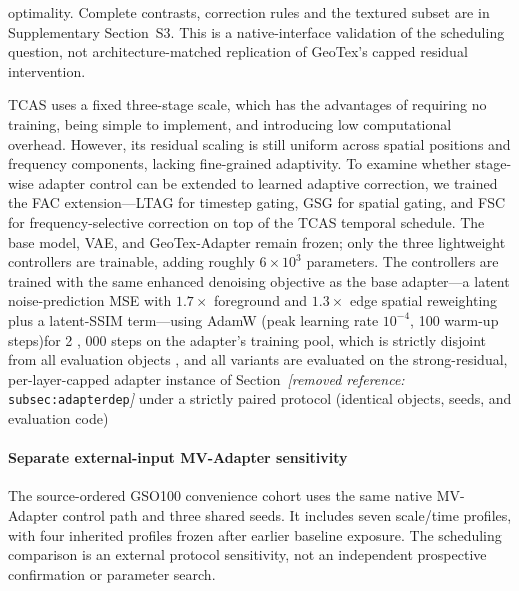 \documentclass[times,twocolumn,final]{elsarticle}
\providecommand{\DIFadd}[1]{{\protect\color{blue} \sf #1}} %
\providecommand{\DIFdel}[1]{{\protect\color{red} \scriptsize #1}} %
\providecommand{\DIFaddbegin}{} %
\providecommand{\DIFaddend}{} %
\providecommand{\DIFdelbegin}{} %
\providecommand{\DIFdelend}{} %
\begin{document}
\DIFdelend \DIFaddbegin \DIFadd{optimality. Complete contrasts, correction rules and the textured subset are in Supplementary Section~S3. This is a native-interface validation of the scheduling question, not architecture-matched replication of GeoTex's capped residual intervention.
}\DIFaddend


\DIFdelbegin \DIFdel{TCAS uses a fixed three-stage scale, which has the advantages of requiring no training, being simple to implement, and introducing low computational overhead. However, its residual scaling is still uniform across spatial positions and frequency components, lacking fine-grained adaptivity. To examine whether stage-wise adapter control can be extended to learned adaptive correction, we trained the FAC extension---LTAG for timestep gating, GSG for spatial gating, and FSC for frequency-selective correction on top of the TCAS temporal schedule. The base model, VAE, and GeoTex-Adapter remain frozen; only the three lightweight controllers are trainable, adding roughly $6\times10^{3}$ parameters. The controllers are trained with the same enhanced denoising objective as the base adapter---a latent noise-prediction MSE with $1.7\times$ foreground and $1.3\times$ edge spatial reweighting plus a latent-SSIM term---using AdamW (peak learning rate $10^{-4}$, 100 warm-up steps)for 2}%
\DIFdel{,}%
\DIFdel{000 steps on the adapter's training pool, which is strictly disjoint from all evaluation objects , and all variants are evaluated on the strong-residual, per-layer-capped adapter instance of Section~\textit{[removed reference: }\texttt{subsec:adapterdep}\textit{]} under a strictly paired protocol (identical objects, seeds, and evaluation code)}\DIFdelend \DIFaddbegin \paragraph{Separate external-input MV-Adapter sensitivity}
\DIFadd{The source-ordered GSO100 convenience cohort uses the same native MV-Adapter control path and three shared seeds. It includes seven scale/time profiles, with four inherited profiles frozen after earlier baseline exposure. The scheduling comparison is an external protocol sensitivity, not an independent prospective confirmation or parameter search}\DIFaddend .
\end{document}
